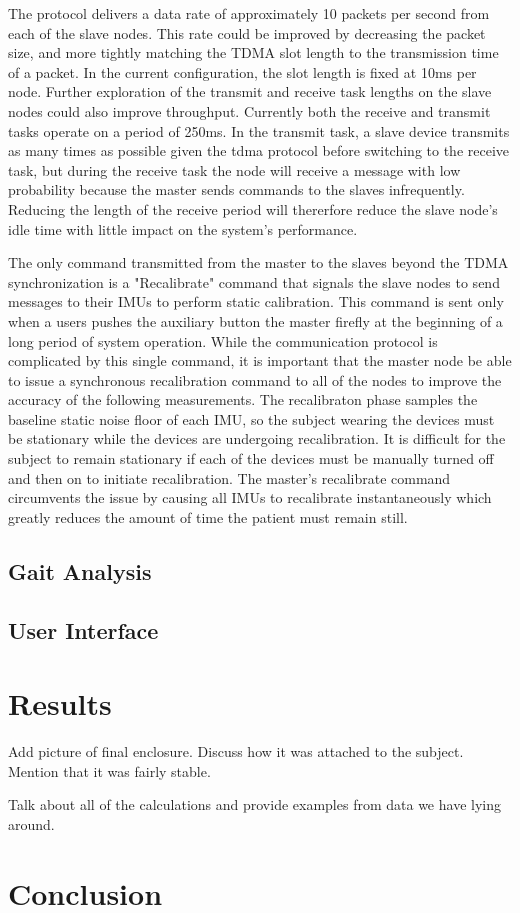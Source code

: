 \documentclass[conference]{IEEEtran}
\begin{document}
The protocol delivers a data rate of approximately 10 packets per second from each of
the slave nodes. This rate could be improved by decreasing the packet size, and more
tightly matching the TDMA slot length to the transmission time of a packet. In the current
configuration, the slot length is fixed at 10ms per node. Further exploration of the
transmit and receive task lengths on the slave nodes could also improve throughput.
Currently both the receive and transmit tasks operate on a period of 250ms. In the
transmit task, a slave device transmits as many times as possible given the tdma protocol
before switching to the receive task, but during the receive task the node will receive a
message with low probability because the master sends commands to the slaves infrequently.
Reducing the length of the receive period will thererfore reduce the slave node's idle
time with little impact on the system's performance. 

  The only command transmitted from the master to the slaves beyond the TDMA synchronization
is a "Recalibrate" command that signals the slave nodes to send messages to their IMUs to
perform static calibration. This command is sent only when a users pushes the auxiliary
button the master firefly at the beginning of a long period of system operation. While the
communication protocol is complicated by this single command, it is important that the
master node be able to issue a synchronous recalibration command to all of the nodes to
improve the accuracy of the following measurements. The recalibraton phase samples the
baseline static noise floor of each IMU, so the subject wearing the devices must be
stationary while the devices are undergoing recalibration. It is difficult for the subject
to remain stationary if each of the devices must be manually turned off and then on to initiate
recalibration. The master's recalibrate command circumvents the issue by causing all IMUs
to recalibrate instantaneously which greatly reduces the amount of time the patient must
remain still. 

\subsection{Gait Analysis}

\subsection{User Interface}

\section{Results}
Add picture of final enclosure. Discuss how it was attached to the subject. Mention that
it was fairly stable.

Talk about all of the calculations and provide examples from data we have lying around. 

\section{Conclusion} 


\balance

\end{document}
